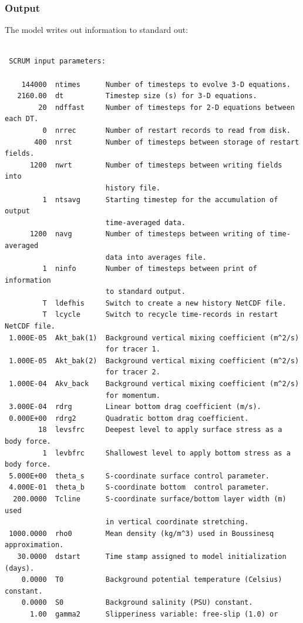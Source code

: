 \subsubsection{Output}
The model writes out information to standard out:
\begin{verbatim}

 SCRUM input parameters:

    144000  ntimes      Number of timesteps to evolve 3-D equations.
   2160.00  dt          Timestep size (s) for 3-D equations.
        20  ndffast     Number of timesteps for 2-D equations between each DT.
         0  nrrec       Number of restart records to read from disk.
       400  nrst        Number of timesteps between storage of restart fields.
      1200  nwrt        Number of timesteps between writing fields into
                        history file.
         1  ntsavg      Starting timestep for the accumulation of output
                        time-averaged data.
      1200  navg        Number of timesteps between writing of time-averaged
                        data into averages file.
         1  ninfo       Number of timesteps between print of information 
                        to standard output.
         T  ldefhis     Switch to create a new history NetCDF file.
         T  lcycle      Switch to recycle time-records in restart NetCDF file.
 1.000E-05  Akt_bak(1)  Background vertical mixing coefficient (m^2/s)
                        for tracer 1.
 1.000E-05  Akt_bak(2)  Background vertical mixing coefficient (m^2/s)
                        for tracer 2.
 1.000E-04  Akv_back    Background vertical mixing coefficient (m^2/s)
                        for momentum.
 3.000E-04  rdrg        Linear bottom drag coefficient (m/s).
 0.000E+00  rdrg2       Quadratic bottom drag coefficient.
        18  levsfrc     Deepest level to apply surface stress as a body force.
         1  levbfrc     Shallowest level to apply bottom stress as a body force.
 5.000E+00  theta_s     S-coordinate surface control parameter.
 4.000E-01  theta_b     S-coordinate bottom  control parameter.
  200.0000  Tcline      S-coordinate surface/bottom layer width (m) used
                        in vertical coordinate stretching.
 1000.0000  rho0        Mean density (kg/m^3) used in Boussinesq approximation.
   30.0000  dstart      Time stamp assigned to model initialization (days).
    0.0000  T0          Background potential temperature (Celsius) constant.
    0.0000  S0          Background salinity (PSU) constant.
      1.00  gamma2      Slipperiness variable: free-slip (1.0) or 

\end{verbatim}

